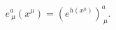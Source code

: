 \begin{equation}
\label{gpara}
 e^a_{~\mu}(x^\mu)=\left( e^{h(x^\mu)}\right)^a_{~\mu}.
\end{equation} 
